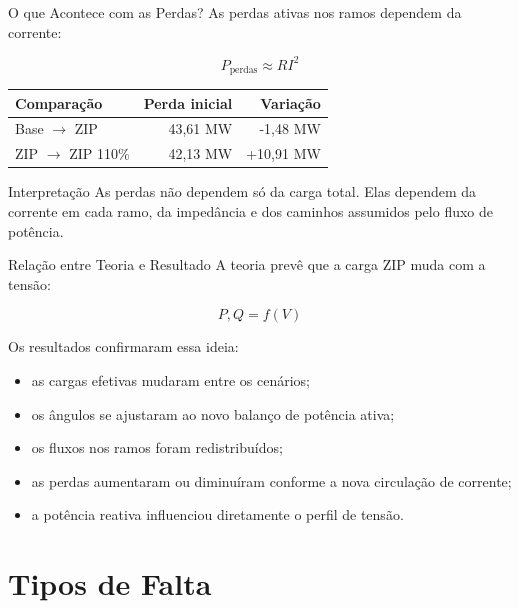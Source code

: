 \documentclass[aspectratio=169,11pt]{beamer}
\begin{document}
\begin{frame}{O que Acontece com as Perdas?}
  As perdas ativas nos ramos dependem da corrente:

  \[
    P_{\text{perdas}} \approx R I^2
  \]

  \begin{table}
    \centering
    \small
    \begin{tabular}{lrr}
      \toprule
      Comparação & Perda inicial & Variação \\
      \midrule
      Base $\rightarrow$ ZIP & 43,61 MW & -1,48 MW \\
      ZIP $\rightarrow$ ZIP 110\% & 42,13 MW & +10,91 MW \\
      \bottomrule
    \end{tabular}
  \end{table}

  \begin{block}{Interpretação}
    As perdas não dependem só da carga total. Elas dependem da corrente em cada ramo, da impedância e dos caminhos assumidos pelo fluxo de potência.
  \end{block}
\end{frame}

\begin{frame}{Relação entre Teoria e Resultado}
  A teoria prevê que a carga ZIP muda com a tensão:

  \[
    P,Q = f(V)
  \]

  Os resultados confirmaram essa ideia:

  \begin{itemize}
    \item as cargas efetivas mudaram entre os cenários;
    \item os ângulos se ajustaram ao novo balanço de potência ativa;
    \item os fluxos nos ramos foram redistribuídos;
    \item as perdas aumentaram ou diminuíram conforme a nova circulação de corrente;
    \item a potência reativa influenciou diretamente o perfil de tensão.
  \end{itemize}
\end{frame}

\section{Tipos de Falta}
\end{document}
